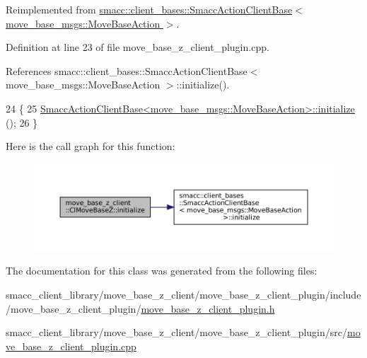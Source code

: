 Reimplemented from \hyperlink{classsmacc_1_1client__bases_1_1SmaccActionClientBase_a72967f255f85e35718a1e1b0b48c38ff}{smacc\+::client\+\_\+bases\+::\+Smacc\+Action\+Client\+Base$<$ move\+\_\+base\+\_\+msgs\+::\+Move\+Base\+Action $>$}.



Definition at line 23 of file move\+\_\+base\+\_\+z\+\_\+client\+\_\+plugin.\+cpp.



References smacc\+::client\+\_\+bases\+::\+Smacc\+Action\+Client\+Base$<$ move\+\_\+base\+\_\+msgs\+::\+Move\+Base\+Action $>$\+::initialize().


\begin{DoxyCode}
24 \{
25     \hyperlink{classsmacc_1_1client__bases_1_1SmaccActionClientBase_a72967f255f85e35718a1e1b0b48c38ff}{SmaccActionClientBase<move\_base\_msgs::MoveBaseAction>::initialize}
      ();
26 \}
\end{DoxyCode}
Here is the call graph for this function\+:
\nopagebreak
\begin{figure}[H]
\begin{center}
\leavevmode
\includegraphics[width=350pt]{classmove__base__z__client_1_1ClMoveBaseZ_a082cef8bf5dbd0ec06adfe2a7aefbf70_cgraph}
\end{center}
\end{figure}


The documentation for this class was generated from the following files\+:\begin{DoxyCompactItemize}
\item 
smacc\+\_\+client\+\_\+library/move\+\_\+base\+\_\+z\+\_\+client/move\+\_\+base\+\_\+z\+\_\+client\+\_\+plugin/include/move\+\_\+base\+\_\+z\+\_\+client\+\_\+plugin/\hyperlink{move__base__z__client__plugin_8h}{move\+\_\+base\+\_\+z\+\_\+client\+\_\+plugin.\+h}\item 
smacc\+\_\+client\+\_\+library/move\+\_\+base\+\_\+z\+\_\+client/move\+\_\+base\+\_\+z\+\_\+client\+\_\+plugin/src/\hyperlink{move__base__z__client__plugin_8cpp}{move\+\_\+base\+\_\+z\+\_\+client\+\_\+plugin.\+cpp}\end{DoxyCompactItemize}

